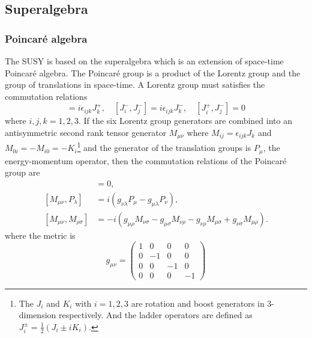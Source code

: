 
\subsection{Superalgebra}
\label{subsec:susy_superalgebra}


\subsubsection{Poincar\'{e} algebra}
\label{subsubsec:susy_poincare}
The SUSY is based on the superalgebra which is an extension of space-time Poincar\'{e} algebra.
The Poincar\'{e} group is a product of the Lorentz group and the group of translations in space-time.
A Lorentz group must satisfies the commutation relations
%
\begin{equation}
    [J^{+}_{i}, J^{+}_{j}] = i \epsilon_{ijk} J^{+}_{k}, \quad 
    [J^{-}_{i}, J^{-}_{j}] = i \epsilon_{ijk} J^{-}_{k}, \quad 
    [J^{+}_{i}, J^{-}_{j}] = 0
    \label{eq:susy_Lorentz_commutation_relations}
\end{equation}
%
where $i, j, k = 1, 2, 3$.
If the six Lorentz group generators are combined into an antisymmetric second rank tensor generator $M_{\mu\nu}$ where $M_{ij} = \epsilon_{ijk}J_{k}$ and $M_{0i} = -M_{i0} = -K_{i}$\footnote{The $J_{i}$ and $K_{i}$ with $i=1,2,3$ are rotation and boost generators in 3-dimension respectively. And the ladder operators are defined as $J_{i}^{\pm} = \frac{1}{2} (J_{i} \pm i K_{i})$.} and the generator of the translation groups is $P_{\mu}$, the energy-momentum operator, then the commutation relations of the Poincar\'{e} group are
%
\begin{align}
    [P_{\mu}, P_{\nu}] &= 0 ,\\
    [M_{\mu \nu}, P_{\lambda}] &= i (g_{\nu \lambda} P_{\mu} - g_{\mu \lambda} P_{\nu}) ,\\
    [M_{\mu \nu}, M_{\rho \sigma}] &= -i (g_{\mu \rho} M_{\nu \sigma} - g_{\mu \sigma} M_{\nu \rho} - g_{\nu \rho} M_{\mu \sigma} + g_{\nu \sigma} M_{\mu \rho}) .
    \label{eq:susy_Poincare_commutation_relations}
\end{align}
%
where the metric is 
\begin{equation}
    g_{\mu \nu} =
    \left(
        \begin{array}{cccc}
            1 & 0  & 0  & 0\\
            0 & -1 & 0  & 0\\
            0 & 0  & -1 & 0\\
            0 & 0  & 0  & -1   
        \end{array}
    \right)
    \label{eq:susy_metric}
\end{equation}
%

